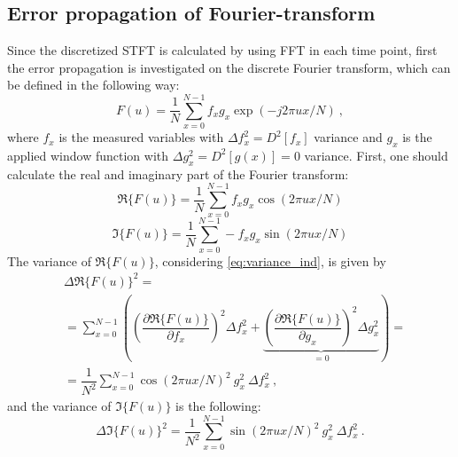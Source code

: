 \documentclass[a4paper,12pt,oneside]{article}
\begin{document}
\subsection{Error propagation of Fourier-transform}\label{sec:ep_analytical}

Since the discretized STFT is calculated by using FFT in each time point, first the error propagation is investigated on the discrete Fourier transform, which can be defined in the following way:
\begin{equation}\label{eq:fft}
  F(u) = \frac{1}{N} \sum\limits_{x=0}^{N-1} f_x g_x \exp(-j2\pi ux/N) \ ,
\end{equation}
where $f_x$ is the measured variables with $\Delta f_x^2 = D^2[f_x]$ variance and $g_x$ is the applied window function with $\Delta g_x^2 = D^2[g(x)] = 0$ variance. First, one should calculate the real and imaginary part of the Fourier transform:
\begin{equation}\label{eq:re}
  \Re\{F(u)\} = \frac{1}{N} \sum\limits_{x=0}^{N-1} f_x g_x \cos(2\pi ux/N)
\end{equation}
\begin{equation}\label{eq:im}
  \Im\{F(u)\} = \frac{1}{N} \sum\limits_{x=0}^{N-1} - f_x g_x \sin(2\pi ux/N)
\end{equation}
The variance of $\Re\{F(u)\}$, considering \eqref{eq:variance_ind}, is given by
\begin{eqnarray}\label{eq:dref}
  & \Delta \Re\{F(u)\}^2 = \nonumber\\
  & = \sum\limits_{x=0}^{N-1} \left(
  \left( \dfrac{\partial \Re\{ F(u) \}}{\partial f_x} \right)^2 \Delta f_x^2 + 
  \underbrace{\left( \dfrac{\partial \Re\{ F(u) \}}{\partial g_x} \right)^2 \Delta g_x^2}_\text{$=0$} \right) = \nonumber\\
  & = \dfrac{1}{N^2} \sum\limits_{x=0}^{N-1}  \cos(2\pi ux/N)^2 \ g_x^2 \ \Delta f_x^2 \ ,
\end{eqnarray}
and the variance of $\Im\{F(u)\}$ is the following:
\begin{equation}\label{eq:dimf}
  \Delta \Im\{F(u)\}^2 = \dfrac{1}{N^2} \sum\limits_{x=0}^{N-1}  \sin(2\pi ux/N)^2 \ g_x^2 \ \Delta f_x^2 \ .
\end{equation}
\end{document}
